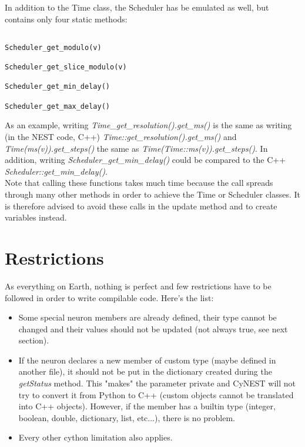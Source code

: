 \documentclass{article}
\begin{document}
In addition to the Time class, the Scheduler has be emulated as well, but contains only four static methods:
\begin{verbatim}

Scheduler_get_modulo(v)

Scheduler_get_slice_modulo(v)

Scheduler_get_min_delay()

Scheduler_get_max_delay()

\end{verbatim}

As an example, writing \emph{Time\_get\_resolution().get\_ms()} is the same as writing (in the NEST code, C++) \emph{Time::get\_resolution().get\_ms()} and \\ \emph{Time(ms(v)).get\_steps()} the same as \emph{Time(Time::ms(v)).get\_steps()}. In addition, writing \emph{Scheduler\_get\_min\_delay()} could be compared to the C++ \emph{Scheduler::get\_min\_delay()}.\\
Note that calling these functions takes much time because the call spreads through many other methods in order to achieve the Time or Scheduler classes. It is therefore advised to avoid these calls in the update method and to create variables instead.


\section{Restrictions}
As everything on Earth, nothing is perfect and few restrictions have to be followed in order to write compilable code. Here's the list:
\begin{itemize}
\item Some special neuron members are already defined, their type cannot be changed and their values should not be updated (not always true, see next section).
\item If the neuron declares a new member of custom type (maybe defined in another file), it should not be put in the dictionary created during the \emph{getStatus} method. This "makes" the parameter private and CyNEST will not try to convert it from Python to C++ (custom objects cannot be translated into C++ objects). However, if the member has a builtin type (integer, boolean, double, dictionary, list, etc...), there is no problem.
\item Every other cython limitation also applies.
\end{itemize}
\end{document}
